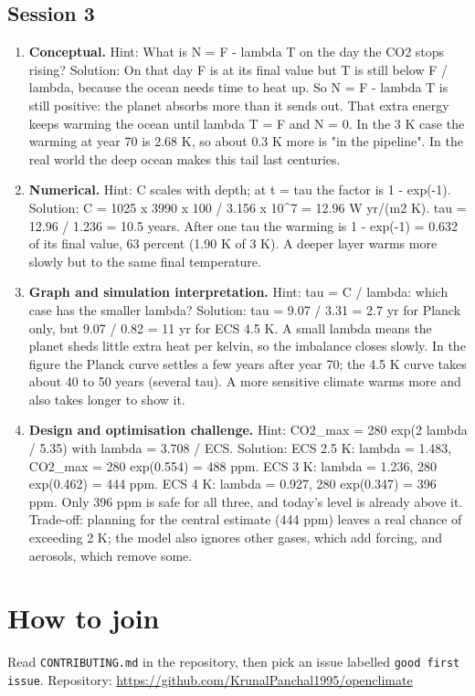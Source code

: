 \documentclass[11pt,a4paper]{article}
\begin{document}
\subsection*{Session 3}
\begin{enumerate}[nosep]
\item \textbf{Conceptual.} Hint: What is N = F - lambda T on the day the CO2 stops rising? Solution: On that day F is at its final value but T is still below F / lambda, because the ocean needs time to heat up. So N = F - lambda T is still positive: the planet absorbs more than it sends out. That extra energy keeps warming the ocean until lambda T = F and N = 0. In the 3 K case the warming at year 70 is 2.68 K, so about 0.3 K more is "in the pipeline". In the real world the deep ocean makes this tail last centuries.
\item \textbf{Numerical.} Hint: C scales with depth; at t = tau the factor is 1 - exp(-1). Solution: C = 1025 x 3990 x 100 / 3.156 x 10\textasciicircum{}7 = 12.96 W yr/(m2 K). tau = 12.96 / 1.236 = 10.5 years. After one tau the warming is 1 - exp(-1) = 0.632 of its final value, 63 percent (1.90 K of 3 K). A deeper layer warms more slowly but to the same final temperature.
\item \textbf{Graph and simulation interpretation.} Hint: tau = C / lambda: which case has the smaller lambda? Solution: tau = 9.07 / 3.31 = 2.7 yr for Planck only, but 9.07 / 0.82 = 11 yr for ECS 4.5 K. A small lambda means the planet sheds little extra heat per kelvin, so the imbalance closes slowly. In the figure the Planck curve settles a few years after year 70; the 4.5 K curve takes about 40 to 50 years (several tau). A more sensitive climate warms more and also takes longer to show it.
\item \textbf{Design and optimisation challenge.} Hint: CO2\_max = 280 exp(2 lambda / 5.35) with lambda = 3.708 / ECS. Solution: ECS 2.5 K: lambda = 1.483, CO2\_max = 280 exp(0.554) = 488 ppm. ECS 3 K: lambda = 1.236, 280 exp(0.462) = 444 ppm. ECS 4 K: lambda = 0.927, 280 exp(0.347) = 396 ppm. Only 396 ppm is safe for all three, and today's level is already above it. Trade-off: planning for the central estimate (444 ppm) leaves a real chance of exceeding 2 K; the model also ignores other gases, which add forcing, and aerosols, which remove some.
\end{enumerate}

\section{How to join}
Read \texttt{CONTRIBUTING.md} in the repository, then pick an issue labelled \texttt{good first issue}. Repository: \url{https://github.com/KrunalPanchal1995/openclimate}
\end{document}
